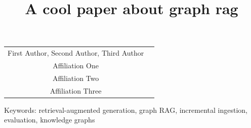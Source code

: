 \documentclass[10pt]{cai}
\begin{document}
\def\conferenceyear{2026}
\begin{center}

\title{A cool paper about graph rag}
\maketitle

\thispagestyle{empty}

\begin{tabular}{cc}
First Author\upstairs{\affilone,*}, Second Author\upstairs{\affilone}, Third Author\upstairs{\affilthree}
\\[0.25ex]
{\small \upstairs{\affilone} Affiliation One} \\
{\small \upstairs{\affiltwo} Affiliation Two} \\
{\small \upstairs{\affilthree} Affiliation Three} \\
\end{tabular}
  
\vspace*{0.2in}
\end{center}

\begin{abstract}
\lipsum[1]
\end{abstract}

\begin{keywords}{Keywords:}
retrieval-augmented generation, graph RAG, incremental ingestion, evaluation, knowledge graphs
\end{keywords}
\copyrightnotice






\printbibliography[heading=subbibintoc]
\end{document}
